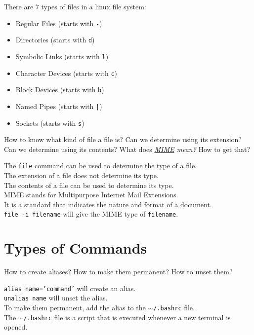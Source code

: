 \begin{ans}
  There are 7 types of files in a linux file system:
  \begin{itemize}
    \item Regular Files (starts with \texttt{-})
    \item Directories (starts with \texttt{d})
    \item Symbolic Links (starts with \texttt{l})
    \item Character Devices (starts with \texttt{c})
    \item Block Devices (starts with \texttt{b})
    \item Named Pipes (starts with \texttt{|})
    \item Sockets (starts with \texttt{s})
  \end{itemize}
\end{ans}

\begin{qs}
  How to know what kind of file a file is? Can we determine using
  its extension? Can we determine using its contents? What does
  \textit{
  \href{https://developer.mozilla.org/en-US/docs/Web/HTTP/Basics_of_HTTP/MIME_types}{MIME} mean?
}
How to get that?
\end{qs}

\begin{ans}
  The \texttt{file} command can be used to determine the type of a file. \\
  The extension of a file does not determine its type. \\
  The contents of a file can be used to determine its type. \\
  MIME stands for Multipurpose Internet Mail Extensions. \\
  It is a standard that indicates the nature and format of a document. \\
  \texttt{file -i filename} will give the MIME type of \texttt{filename}.
\end{ans}
\section{Types of Commands}

\begin{qs}
  How to create aliases? How to make them permanent? How to unset them?
\end{qs}

\begin{ans}
  \texttt{alias name='command'} will create an alias. \\
  \texttt{unalias name} will unset the alias. \\
  To make them permanent, add the alias to the \texttt{$\sim$/.bashrc} file. \\
  The \texttt{$\sim$/.bashrc} file is a script that is executed whenever a new terminal is opened.
\end{ans}

